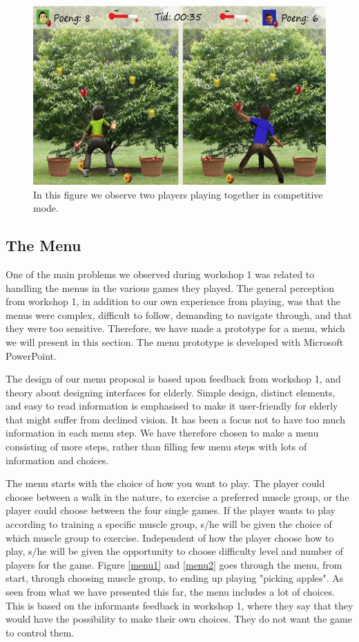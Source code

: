 \begin{figure} [H]
\centering
\includegraphics[scale=0.8]{multiplayereple.jpg}
\caption[Picking apples - multi player]{In this figure we observe two players playing together in competitive mode.}
\label{fig:appleMultiplayer}
\end{figure}

\subsection{The Menu}
\label{sec:menu}

One of the main problems we observed during workshop 1 was related to handling the menus in the various games they played. The general perception from workshop 1, in addition to our own experience from playing, was that the menus were complex, difficult to follow, demanding to navigate through, and that they were too sensitive. Therefore, we have made a prototype for a menu, which we will present in this section. The menu prototype is developed with Microsoft PowerPoint.

The design of our menu proposal is based upon feedback from workshop 1, and theory about designing interfaces for elderly. Simple design, distinct elements, and easy to read information is emphasised to make it user-friendly for elderly that might suffer from declined vision. It has been a focus not to have too much information in each menu step. We have therefore chosen to make a menu consisting of more steps, rather than filling few menu steps with lots of information and choices.   

The menu starts with the choice of how you want to play. The player could choose between a walk in the nature, to exercise a preferred muscle group, or the player could choose between the four single games. If the player wants to play according to training a specific muscle group, s/he will be given the choice of which muscle group to exercise. Independent of how the player choose how to play, s/he will be given the opportunity to choose difficulty level and number of players for the game. Figure \ref{menu1} and \ref{menu2} goes through the menu, from start, through choosing muscle group, to ending up playing "picking apples". As seen from what we have presented this far, the menu includes a lot of choices. This is based on the informants feedback in workshop 1, where they say that they would have the possibility to make their own choices. They do not want the game to control them.   

